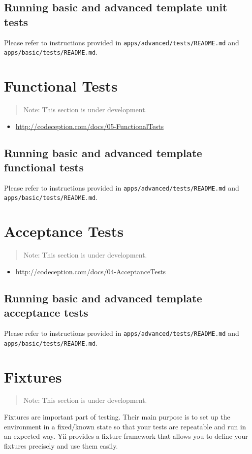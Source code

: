 \subsection{Running basic and advanced template unit tests}
Please refer to instructions provided in \lstinline|apps/advanced/tests/README.md| and \lstinline|apps/basic/tests/README.md|.



\label{test-functional.md}\section{Functional Tests}
\begin{quote}Note: This section is under development.

\end{quote}
\begin{itemize}
\item \url{http://codeception.com/docs/05-FunctionalTests}
\end{itemize}
\subsection{Running basic and advanced template functional tests}
Please refer to instructions provided in \lstinline|apps/advanced/tests/README.md| and \lstinline|apps/basic/tests/README.md|.



\label{test-acceptance.md}\section{Acceptance Tests}
\begin{quote}Note: This section is under development.

\end{quote}
\begin{itemize}
\item \url{http://codeception.com/docs/04-AcceptanceTests}
\end{itemize}
\subsection{Running basic and advanced template acceptance tests}
Please refer to instructions provided in \lstinline|apps/advanced/tests/README.md| and \lstinline|apps/basic/tests/README.md|.



\label{test-fixtures.md}\section{Fixtures}
\begin{quote}Note: This section is under development.

\end{quote}
Fixtures are important part of testing. Their main purpose is to set up the environment in a fixed/known state
so that your tests are repeatable and run in an expected way. Yii provides a fixture framework that allows
you to define your fixtures precisely and use them easily.

